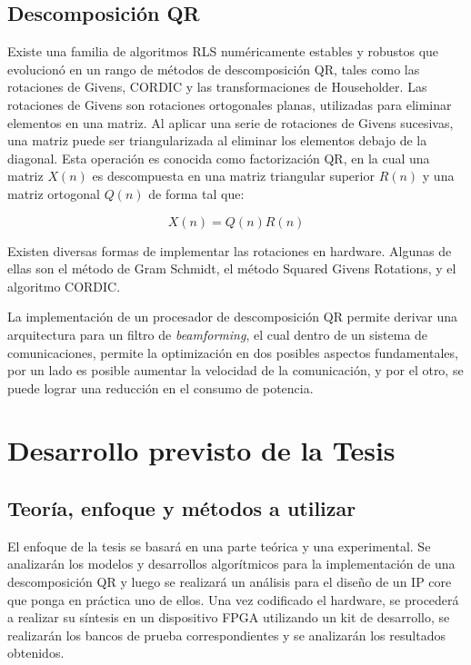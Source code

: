 \documentclass[a4paper]{article}
\begin{document}
\subsection{Descomposición QR}

Existe una familia de algoritmos RLS numéricamente estables y robustos que evolucionó en un rango de métodos de descomposición QR, tales como las rotaciones de Givens, CORDIC y las transformaciones de Householder. Las rotaciones de Givens son rotaciones ortogonales planas, utilizadas para eliminar elementos en una matriz. Al aplicar una serie de rotaciones de Givens sucesivas, una matriz puede ser triangularizada al eliminar los elementos debajo de la diagonal. Esta operación es conocida como factorización QR, en la cual una matriz $X(n)$ es descompuesta en una matriz triangular superior $R(n)$ y una matriz ortogonal $Q(n)$ de forma tal que:

\[
X(n) = Q(n)R(n)
\]

Existen diversas formas de implementar las rotaciones en hardware. Algunas de ellas son el método de Gram Schmidt, el método Squared Givens Rotations, y el algoritmo CORDIC.

La implementación de un procesador de descomposición QR permite derivar una arquitectura para un filtro de \textit{beamforming}, el cual dentro de un sistema de comunicaciones, permite la optimización en dos posibles aspectos fundamentales, por un lado es posible aumentar la velocidad de la comunicación, y por el otro, se puede lograr una reducción en el consumo de potencia.

\section{Desarrollo previsto de la Tesis}

\subsection{Teoría, enfoque y métodos a utilizar}

El enfoque de la tesis se basará en una parte teórica y una experimental.
Se analizarán los modelos y desarrollos algorítmicos para la implementación de una descomposición QR y luego se realizará un análisis para el diseño de un IP core que ponga en práctica uno de ellos. Una vez codificado el hardware, se procederá a realizar su síntesis en un dispositivo FPGA utilizando un kit de desarrollo, se realizarán los bancos de prueba correspondientes y se analizarán los resultados obtenidos. 
\end{document}
